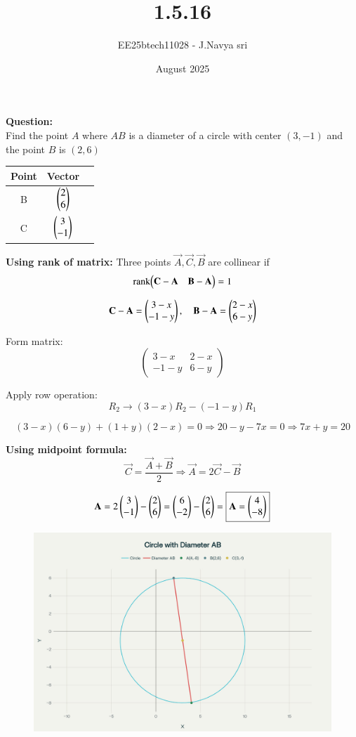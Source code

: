 \documentclass{beamer}
\title %
{1.5.16}
\date{August  2025}
\author{EE25btech11028 - J.Navya sri}
{\let\newpage\relax\maketitle}
\numberwithin{equation}{enumi}
\numberwithin{figure}{enumi}
\begin{document}
\textbf{Question:} \\
Find the point $A$ where $AB$ is a diameter of a circle with center $(3,-1)$ and the point $B$ is $(2,6)$

\bigskip

\begin{tabular}[12pt]{ |c| c| c|} 
    \hline
    {Point} & {Vector} \\ 
    \hline
    B & $ \begin{pmatrix}2 \\ 6\end{pmatrix} $  \\
    \hline
    C & $ \begin{pmatrix}3 \\ -1\end{pmatrix} $   \\
    \hline  
\end{tabular}

\bigskip

\textbf{Using rank of matrix:}
\bigskip
Three points \( \vec{A}, \vec{C}, \vec{B} \) are collinear if
\[
\text{rank}{\begin{pmatrix} \mathbf{C} - \mathbf{A} & \mathbf{B} - \mathbf{A} \end{pmatrix}} = 1
\]

\[
\mathbf{C} - \mathbf{A} = \begin{pmatrix}3 - x\\ -1 - y\end{pmatrix}, \quad
\mathbf{B} - \mathbf{A} = \begin{pmatrix}2 - x\\ 6 - y\end{pmatrix}
\]

Form matrix:
\[
\begin{pmatrix}
3 - x & 2 - x \\
-1 - y & 6 - y
\end{pmatrix}
\]

Apply row operation:
\[
R_2 \rightarrow (3 - x)R_2 - (-1 - y)R_1
\]

\[
(3 - x)(6 - y) + (1 + y)(2 - x) = 0
\Rightarrow 20 - y - 7x = 0 \Rightarrow \boxed{7x + y = 20}
\]

\bigskip

\textbf{Using midpoint formula:}
\[
\vec{C} = \frac{\vec{A} + \vec{B}}{2} \Rightarrow \vec{A} = 2\vec{C} - \vec{B}
\]

\[
\mathbf{A} = 2\begin{pmatrix}3\\-1\end{pmatrix} - \begin{pmatrix}2\\6\end{pmatrix} = \begin{pmatrix}6\\-2\end{pmatrix} - \begin{pmatrix}2\\6\end{pmatrix} = \boxed{\mathbf{A} = \begin{pmatrix}4\\-8\end{pmatrix}}
\]

\begin{figure}[H]
    \centering
    \includegraphics[width=0.5\linewidth]{figs/fig.png}
    \caption{}
    \label{fig:placeholder}
\end{figure}
\end{document}
